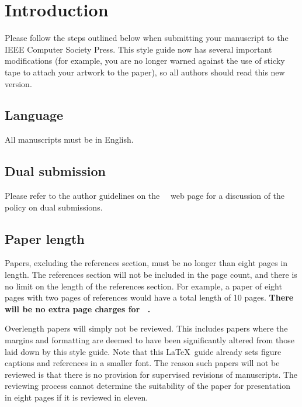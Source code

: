 \section{Introduction}
\label{sec:intro}

Please follow the steps outlined below when submitting your manuscript to the IEEE Computer Society Press.
This style guide now has several important modifications (for example, you are no longer warned against the use of sticky tape to attach your artwork to the paper), so all authors should read this new version.

\subsection{Language}

All manuscripts must be in English.

\subsection{Dual submission}

Please refer to the author guidelines on the \confName\ \confYear\ web page for a
discussion of the policy on dual submissions.

\subsection{Paper length}
Papers, excluding the references section, must be no longer than eight pages in length.
The references section will not be included in the page count, and there is no limit on the length of the references section.
For example, a paper of eight pages with two pages of references would have a total length of 10 pages.
{\bf There will be no extra page charges for \confName\ \confYear.}

Overlength papers will simply not be reviewed.
This includes papers where the margins and formatting are deemed to have been significantly altered from those laid down by this style guide.
Note that this \LaTeX\ guide already sets figure captions and references in a smaller font.
The reason such papers will not be reviewed is that there is no provision for supervised revisions of manuscripts.
The reviewing process cannot determine the suitability of the paper for presentation in eight pages if it is reviewed in eleven.

